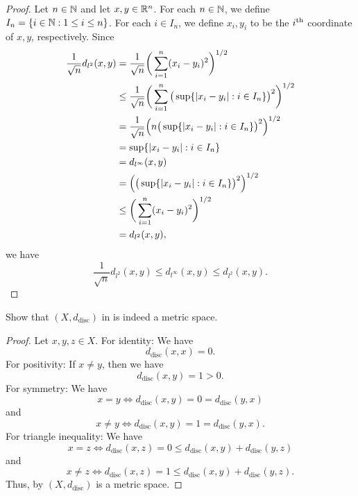 \begin{proof}
  Let \(n \in \mathbb{N}\) and let \(x, y \in \mathbb{R}^n\).
  For each \(n \in \mathbb{N}\), we define \(I_n = \left\lbrace i \in \mathbb{N} : 1 \leq i \leq n\right\rbrace\).
  For each \(i \in I_n\), we define \(x_i, y_i\) to be the \(i^{\operatorname{th}}\) coordinate of \(x, y\), respectively.
  Since
  \begin{align*}
    \dfrac{1}{\sqrt{n}} d_{l^2}(x, y) & = \dfrac{1}{\sqrt{n}} \bigg(\sum_{i = 1}^n (x_i - y_i)^2\bigg)^{1 / 2}                                         \\
                                      & \leq \dfrac{1}{\sqrt{n}} \bigg(\sum_{i = 1}^n \big(\sup \set{\abs{x_i - y_i} : i \in I_n}\big)^2\bigg)^{1 / 2} \\
                                      & = \dfrac{1}{\sqrt{n}} \Big(n \big(\sup \set{\abs{x_i - y_i} : i \in I_n}\big)^2\Big)^{1 / 2}                   \\
                                      & = \sup \set{\abs{x_i - y_i} : i \in I_n}                                                                       \\
                                      & = d_{l^\infty}(x, y)                                                                                           \\
                                      & = \Big(\big(\sup \set{\abs{x_i - y_i} : i \in I_n}\big)^2\Big)^{1 / 2}                                         \\
                                      & \leq \bigg(\sum_{i = 1}^n (x_i - y_i)^2\bigg)^{1 / 2}                                                          \\
                                      & = d_{l^2}(x, y),
  \end{align*}
  we have
  \[
    \dfrac{1}{\sqrt{n}} d_{l^2}(x, y) \leq d_{l^\infty}(x, y) \leq d_{l^2}(x, y).
  \]
\end{proof}

\begin{ex}\label{ii:ex:1.1.11}
  Show that \((X, d_{\text{disc}})\) in  is indeed a metric space.
\end{ex}

\begin{proof}
  Let \(x, y, z \in X\).
  For identity:
  We have
  \[
    d_{\text{disc}}(x, x) = 0.
  \]
  For positivity:
  If \(x \neq y\), then we have
  \[
    d_{\text{disc}}(x, y) = 1 > 0.
  \]
  For symmetry:
  We have
  \[
    x = y \iff d_{\text{disc}}(x, y) = 0 = d_{\text{disc}}(y, x)
  \]
  and
  \[
    x \neq y \iff d_{\text{disc}}(x, y) = 1 = d_{\text{disc}}(y, x).
  \]
  For triangle inequality:
  We have
  \[
    x = z \iff d_{\text{disc}}(x, z) = 0 \leq d_{\text{disc}}(x, y) + d_{\text{disc}}(y, z)
  \]
  and
  \[
    x \neq z \iff d_{\text{disc}}(x, z) = 1 \leq d_{\text{disc}}(x, y) + d_{\text{disc}}(y, z).
  \]
  Thus, by  \((X, d_{\text{disc}})\) is a metric space.
\end{proof}

